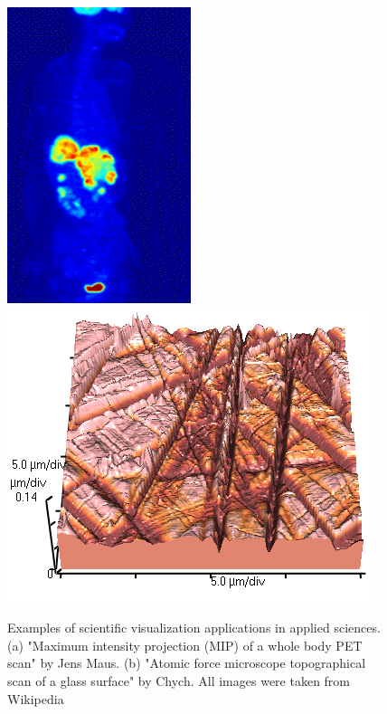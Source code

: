 \begin{figure}[htb] %
   \centering
   \includegraphics[width=0.30\linewidth]{images/PET-MIPS.png}\hfill
   \includegraphics[width=0.45\linewidth]{images/AFMimageRoughGlass.png}
   \caption[Examples of scientific visualization applications in applied sciences]{Examples of scientific visualization applications in applied sciences. (a) "Maximum intensity projection (MIP) of a whole body PET scan" by Jens Maus. (b) "Atomic force microscope topographical scan of a glass surface" by Chych.  All images were taken from Wikipedia}
   \label{fig:AppliedSciencesApp}
\end{figure}

